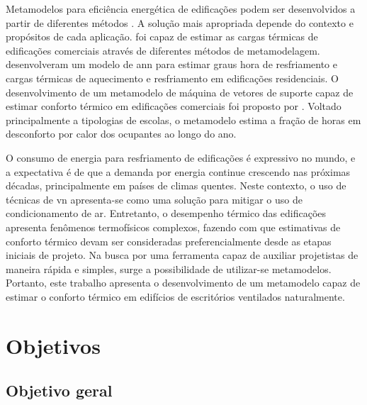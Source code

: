 \documentclass[brazil,hardcopy,openany]{ufscthesis} %
\begin{document}
Metamodelos para eficiência energética de edificações podem ser desenvolvidos a partir de diferentes métodos \cite{Ostergard2018}. A solução mais apropriada depende do contexto e propósitos de cada aplicação.
 foi capaz de estimar as cargas térmicas de edificações comerciais através de diferentes métodos de metamodelagem.
 desenvolveram um modelo de \acrfull{ann} para estimar graus hora de resfriamento e cargas térmicas de aquecimento e resfriamento em edificações residenciais.
O desenvolvimento de um metamodelo de máquina de vetores de suporte capaz de estimar conforto térmico em edificações comerciais foi proposto por . Voltado principalmente a tipologias de escolas, o metamodelo estima a fração de horas em desconforto por calor dos ocupantes ao longo do ano.
%

O consumo de energia para resfriamento de edificações é expressivo no mundo, e a expectativa é de que a demanda por energia continue crescendo nas próximas décadas, principalmente em países de climas quentes.
Neste contexto, o uso de técnicas de \acrfull{vn} apresenta-se como uma solução para mitigar o uso de condicionamento de ar.
Entretanto, o desempenho térmico das edificações apresenta fenômenos termofísicos complexos, fazendo com que estimativas de conforto térmico devam ser consideradas preferencialmente desde as etapas iniciais de projeto. 	
Na busca por uma ferramenta capaz de auxiliar projetistas de maneira rápida e simples, surge a possibilidade de utilizar-se metamodelos.
Portanto, este trabalho apresenta o desenvolvimento de um metamodelo capaz de estimar o conforto térmico em edifícios de escritórios ventilados naturalmente.

\section{Objetivos}
\subsection{Objetivo geral}
\end{document}
